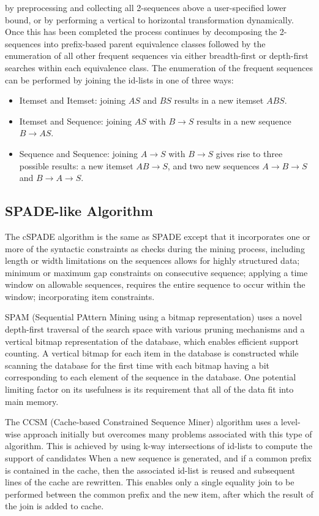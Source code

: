 \documentclass[sigplan, screen]{acmart}
\begin{document}
by preprocessing and collecting all 2-sequences above a user-specified lower bound, or
by performing a vertical to horizontal transformation dynamically.
Once this has been completed the process continues by decomposing the 2-sequences
into prefix-based parent equivalence classes followed by the enumeration of all other
frequent sequences via either breadth-first or depth-first searches within each equivalence class. 
The enumeration of the frequent sequences can be performed by joining
the id-lists in one of three ways:
\begin{itemize}
  \item Itemset and Itemset: joining $AS$ and $BS$ results in a new itemset $ABS$.
  \item Itemset and Sequence: joining $AS$ with $B \to S$ results in a new sequence $B \to AS$.
  \item Sequence and Sequence: joining $A \to S$ with $B \to S$ gives rise to three possible results: a new itemset $AB \to S$, and two new sequences $A \to B \to S$and $B \to A \to S$.
\end{itemize}
\subsection{SPADE-like Algorithm}
The cSPADE algorithm\cite{zaki2000sequence} is the same as SPADE except that it incorporates
one or more of the syntactic constraints as checks during the mining process, including length or width limitations 
on the sequences allows for highly structured data; minimum or maximum gap constraints on consecutive sequence; applying a time window on allowable sequences, requires the entire sequence to
occur within the window; incorporating item constraints.

SPAM (Sequential PAttern Mining using a bitmap representation) \cite{ayres2002sequential} uses a novel depth-first traversal of the search space with various pruning mechanisms
and a vertical bitmap representation of the database, which enables efficient support
counting. A vertical bitmap for each item in the database is constructed while scanning
the database for the first time with each bitmap having a bit corresponding to each
element of the sequence in the database. One potential limiting factor on its usefulness
is its requirement that all of the data fit into main memory.

The CCSM (Cache-based Constrained Sequence Miner) algorithm\cite{orlando2004new} uses a level-wise approach initially but overcomes many problems associated
with this type of algorithm. This is achieved by using k-way intersections of id-lists to compute the support of candidates
When a new sequence is generated, and if a common prefix is contained in the cache, then
the associated id-list is reused and subsequent lines of the cache are rewritten. This enables only a single equality join to be performed between the common prefix and the
new item, after which the result of the join is added to cache.
\end{document}
